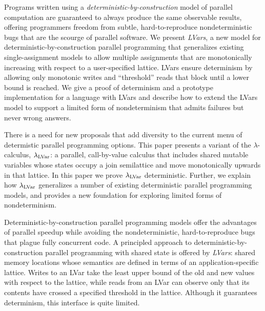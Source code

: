 

  Programs written using a {\em deterministic-by-construction} model
  of parallel computation are guaranteed to always produce the same
  observable results, offering programmers freedom from subtle,
  hard-to-reproduce nondeterministic bugs that are the scourge of
  parallel software.
  We present \emph{LVars}, a new model for deterministic-by-construction parallel
  programming that generalizes existing single-assignment models to
  allow multiple assignments that are monotonically increasing with
  respect to a user-specified lattice.  
  LVars ensure determinism by
  allowing only monotonic writes and ``threshold'' reads that block
  until a lower bound is reached.  We give a proof of determinism
  and a prototype implementation
  for a language with LVars
  and describe how to extend the LVars model to support a limited form of
  nondeterminism that admits failures but never wrong answers.

  There is a need for new proposals that add diversity to the current
  menu of determistic parallel programming options.
  This paper presents a variant of the $\lambda$-calculus, $\lambda_{\textrm{LVar}}$: a
  parallel, call-by-value calculus that includes shared mutable
  variables whose states occupy a join semilattice and move
  monotonically upwards in that lattice.  
  In this paper we prove $\lambda_{\textrm{LVar}}$ deterministic.  
  Further, we explain how $\lambda_{\textrm{LVar}}$ generalizes a number of
  existing deterministic parallel programming models, and provides a
  new foundation for exploring {limited} forms of nondeterminism.
\fi{}


Deterministic-by-construction parallel programming models offer the advantages of parallel speedup while avoiding the nondeterministic, hard-to-reproduce bugs that plague fully concurrent code.
A principled approach to deterministic-by-construction parallel programming with
shared state is offered by \emph{LVars}: shared memory locations whose semantics
are defined in terms of an application-specific lattice.  Writes to an LVar take the
least upper bound of the old and new values with respect to the lattice, while
reads from an LVar can observe only that its contents have crossed a specified
threshold in the lattice.  Although it guarantees determinism, this interface is
quite limited.


